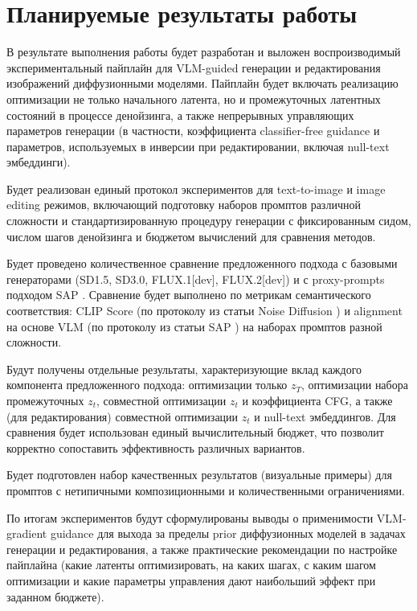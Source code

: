 \section{Планируемые результаты работы}

В результате выполнения работы будет разработан и выложен воспроизводимый экспериментальный пайплайн для VLM-guided генерации и редактирования изображений диффузионными моделями. Пайплайн будет включать реализацию оптимизации не только начального латента, но и промежуточных латентных состояний в процессе денойзинга, а также непрерывных управляющих параметров генерации (в частности, коэффициента classifier-free guidance и параметров, используемых в инверсии при редактировании, включая null-text эмбеддинги).

Будет реализован единый протокол экспериментов для text-to-image и image editing режимов, включающий подготовку наборов промптов различной сложности и стандартизированную процедуру генерации с фиксированным сидом, числом шагов денойзинга и бюджетом вычислений для сравнения методов.

Будет проведено количественное сравнение предложенного подхода с базовыми генераторами (SD1.5, SD3.0, FLUX.1[dev], FLUX.2[dev]) и с proxy-prompts подходом SAP \cite{huberman2025contextually}. Сравнение будет выполнено по метрикам семантического соответствия: CLIP Score (по протоколу из статьи Noise Diffusion \cite{miao2024noisediffusion}) и alignment на основе VLM (по протоколу из статьи SAP \cite{huberman2025contextually}) на наборах промптов разной сложности.

Будут получены отдельные результаты, характеризующие вклад каждого компонента предложенного подхода: оптимизации только $z_T$, оптимизации набора промежуточных $z_t$, совместной оптимизации $z_t$ и коэффициента CFG, а также (для редактирования) совместной оптимизации $z_t$ и null-text эмбеддингов. Для сравнения будет использован единый вычислительный бюджет, что позволит корректно сопоставить эффективность различных вариантов.

Будет подготовлен набор качественных результатов (визуальные примеры) для промптов с нетипичными композиционными и количественными ограничениями.

По итогам экспериментов будут сформулированы выводы о применимости VLM-gradient guidance для выхода за пределы prior диффузионных моделей в задачах генерации и редактирования, а также практические рекомендации по настройке пайплайна (какие латенты оптимизировать, на каких шагах, с каким шагом оптимизации и какие параметры управления дают наибольший эффект при заданном бюджете).
